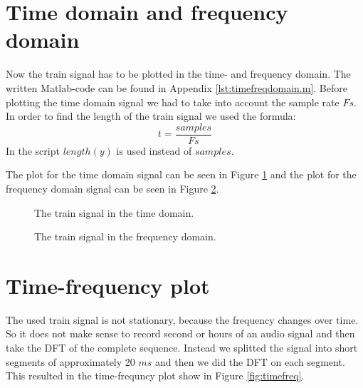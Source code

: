 \documentclass[final]{scrreprt} %
\begin{document}
\section{Time domain and frequency domain}
Now the train signal has to be plotted in the time- and frequency domain.
The written Matlab-code can be found in Appendix \ref{lst:timefreqdomain.m}.
Before plotting the time domain signal we had to take into account the sample rate $Fs$.
In order to find the length of the train signal we used the formula:
\begin{equation}
t = \frac{samples}{Fs}
\end{equation}
In the script $length(y)$ is used instead of $samples$.

The plot for the time domain signal can be seen in Figure \ref{fig:timedomain} and the plot for the frequency domain signal can be seen in Figure \ref{fig:freqdomain}.


\begin{figure}[H]
	\centering
	\setlength\figureheight{6cm}
    	\setlength\figurewidth{10cm}
	
	\caption{The train signal in the time domain.}
	\label{fig:timedomain}
\end{figure}



\begin{figure}[H]
	\centering
	\setlength\figureheight{6cm}
  	\setlength\figurewidth{10cm}
	
	\caption{The train signal in the frequency domain.}
	\label{fig:freqdomain}
\end{figure}

\section{Time-frequency plot}
The used train signal is not stationary, because the frequency changes over time. 
So it does not make sense to record second or hours of an audio signal and then take the DFT of the complete sequence. 
Instead we splitted the signal into short segments of approximately 20 $ms$ and then we did the DFT on each segment. 
This resulted in the time-frequncy plot show in Figure \ref{fig:timefreq}.
\end{document}
